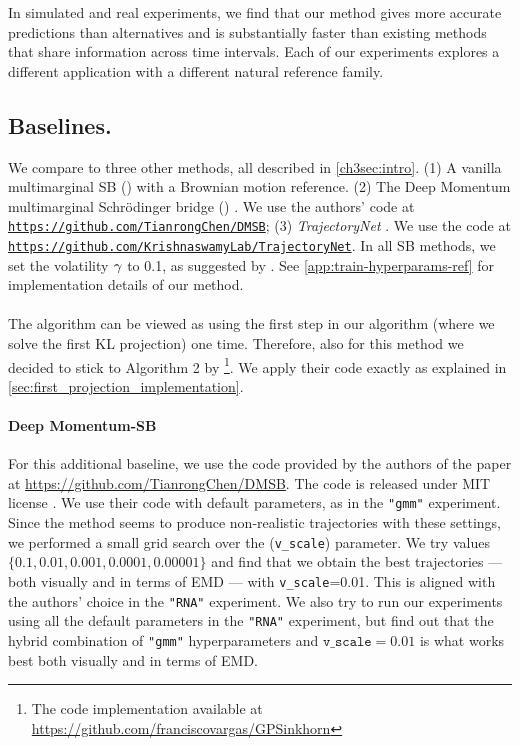 In simulated and real experiments, we find that our method gives more accurate predictions than alternatives and is substantially faster than existing methods that share information across time intervals. Each of our experiments explores a different application with a different natural reference family.

\subsection{Baselines.} We compare to three other methods, all described in \cref{ch3sec:intro}. (1) A vanilla multimarginal SB (\textit{\vanilla{}}) with a Brownian motion reference. 
(2) The Deep Momentum multimarginal Schr\"odinger bridge (\textit{\dmsbname{}}) \citep{chen2024deep}. We use the authors' code at \href{https://github.com/TianrongChen/DMSB.}{\nolinkurl{https://github.com/TianrongChen/DMSB}}; (3) \textit{TrajectoryNet} \citep{tong2020trajectorynet}. We use the code at \href{https://github.com/KrishnaswamyLab/TrajectoryNet}{\nolinkurl{https://github.com/KrishnaswamyLab/TrajectoryNet}}. In all SB methods, we set the volatility $\gamma$ to 0.1, as suggested by \citet{Vargas2021}. See \cref{app:train-hyperparams-ref} for implementation details of our method. 


\paragraph{\vanilla{}}
\label{sec:vanilla-app}
The \vanilla{} algorithm can be viewed as using the first step in our algorithm (where we solve the first KL projection) one time. Therefore, also for this method we decided to stick to Algorithm 2 by \citet{Vargas2021}\footnote{The code implementation available at \href{https://github.com/franciscovargas/GP_Sinkhorn}{https://github.com/franciscovargas/GPSinkhorn}}. We apply their code exactly as explained in \cref{sec:first_projection_implementation}.  

\paragraph{Deep Momentum-SB}
\label{sec:dmsb-app}
For this additional baseline, we use the code provided by the authors of the paper at \href{https://github.com/TianrongChen/DMSB.}{https://github.com/TianrongChen/DMSB}. The code is released under MIT license \citep{dmsb}. We use their code with default parameters, as in the \texttt{"gmm"} experiment. Since the method seems to produce non-realistic trajectories with these settings, we performed a small grid search over the (\texttt{v\_scale}) parameter. We try values $\{0.1,0.01,0.001,0.0001,0.00001\}$ and find that we obtain the best trajectories --- both visually and in terms of EMD --- with \texttt{v\_scale}=0.01. This is aligned with the authors' choice in the \texttt{"RNA"} experiment. We also try to run our experiments using all the default parameters in the \texttt{"RNA"} experiment, but find out that the hybrid combination of \texttt{"gmm"} hyperparameters and $\texttt{v\_scale}=0.01$ is what works best both visually and in terms of EMD. 


